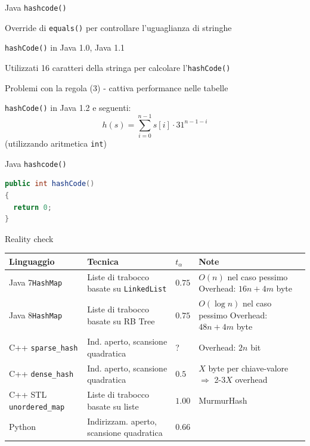\begin{frame}{Java \texttt{hashcode()}}

\vspace{-9pt}
\BIL
\item Override di \texttt{equals()} per controllare l’uguaglianza di stringhe
\item \texttt{hashCode()} in Java 1.0, Java 1.1
\BI
\item Utilizzati 16 caratteri della stringa per calcolare l’\texttt{hashCode()}
\item Problemi con la regola (3) - cattiva performance nelle tabelle
\EI
\item \texttt{hashCode()} in Java 1.2 e seguenti:
\[
  h(s) = \sum_{i=0}^{n-1} s[i] \cdot 31^{n-1-i}
\]
(utilizzando aritmetica \texttt{int})
\EIL

\end{frame}


\begin{frame}[fragile]{Java \texttt{hashcode()}}

\vspace{-9pt}

\begin{lstlisting}[language=java]
public int hashCode()
{
  return 0;
}
\end{lstlisting}

\end{frame}

\begin{frame}[shrink=10]{Reality check}

{\renewcommand*{\arraystretch}{1.4}
\begin{tabular}{|P{2.5cm}|P{4.0cm}|P{0.6cm}|P{4.3cm}|}
\hline
\textbf{Linguaggio} & \textbf{Tecnica} & $t_\alpha$ & \textbf{Note} 
\\ \hline
%
Java 7\newline \texttt{HashMap} &
Liste di trabocco basate su \texttt{LinkedList} &
$0.75$ &
$O(n)$ nel caso pessimo \newline
Overhead: $16n + 4m$ byte
\\ \hline
%
Java 8\newline \texttt{HashMap} &
Liste di trabocco basate su RB Tree &
$0.75$ &
$O(\log n)$ nel caso pessimo \newline
Overhead: $48n + 4m$ byte
\\ \hline
C++ \newline \texttt{sparse\_hash} &
Ind. aperto, scansione quadratica & 
? &
Overhead: $2n$ bit
\\ \hline
C++ \newline \texttt{dense\_hash} &
Ind. aperto, scansione quadratica & 
$0.5$ &
$X$ byte per chiave-valore $\Rightarrow$ 2-3$X$ overhead
\\ \hline
C++ STL \newline \texttt{unordered\_map} &
Liste di trabocco basate su liste &
$1.00$ &
MurmurHash
\\ \hline
Python &
Indirizzam. aperto, scansione quadratica &
$0.66$ &
\\ \hline
\end{tabular}
}
\end{frame}



